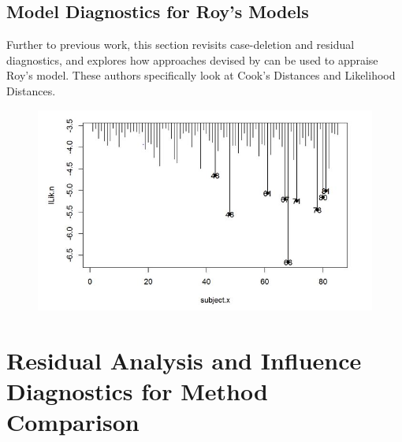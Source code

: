 \documentclass[12pt, a4paper]{report}
\theoremstyle{plain}
\theoremstyle{definition}
\theoremstyle{remark}
\begin{document}
	
	
	
	\section{Model Diagnostics for Roy's Models}
	
	Further to previous work, this section revisits case-deletion and residual diagnostics, and explores how approaches devised by  \citet{Galecki} can be used to appraise Roy's model. These authors specifically look at Cook's Distances and Likelihood Distances.
	
	
	
	
	
	\begin{figure}[h!]
		\centering
		\includegraphics[width=0.7\linewidth]{images/LogLik-JS-Roy}
		\caption{}
		\label{fig:LogLik-JS-Roy}
	\end{figure}
	
	
	
	
	
	
	
	
	
	
	
	

	\chapter{Residual Analysis and Influence Diagnostics for Method Comparison}
	
\end{document}
